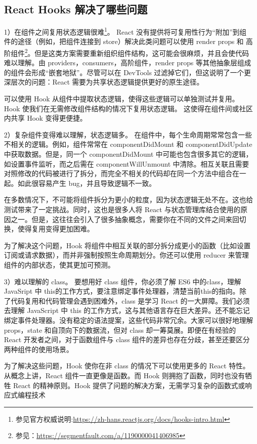\documentclass[../../../interview-questions.tex]{subfiles}
\begin{document}
\subsection{React Hooks 解决了哪些问题}

1）在组件之间复用状态逻辑很难\footnote{参见官方权威说明:\url{https://zh-hans.reactjs.org/docs/hooks-intro.html}}。
React 没有提供将可复用性行为“附加”到组件的途径（例如，把组件连接到 store）解决此类问题可以使用 render props 和 高阶组件\footnote{参见：\url{https://segmentfault.com/a/1190000041406985}}。但是这类方案需要重新组织组件结构，这可能会很麻烦，并且会使代码难以理解。由 providers，consumers，高阶组件，render props 等其他抽象层组成的组件会形成“嵌套地狱”。尽管可以在 DevTools 过滤掉它们，但这说明了一个更深层次的问题：React 需要为共享状态逻辑提供更好的原生途径。

可以使用 Hook 从组件中提取状态逻辑，使得这些逻辑可以单独测试并复用。Hook 使我们在无需修改组件结构的情况下复用状态逻辑。 这使得在组件间或社区内共享 Hook 变得更便捷。

2）复杂组件变得难以理解，状态逻辑多。
在组件中，每个生命周期常常包含一些不相关的逻辑。例如，组件常常在 componentDidMount 和 componentDidUpdate 中获取数据。但是，同一个 componentDidMount 中可能也包含很多其它的逻辑，如设置事件监听，而之后需在 componentWillUnmount 中清除。相互关联且需要对照修改的代码被进行了拆分，而完全不相关的代码却在同一个方法中组合在一起。如此很容易产生 bug，并且导致逻辑不一致。

在多数情况下，不可能将组件拆分为更小的粒度，因为状态逻辑无处不在。这也给测试带来了一定挑战。同时，这也是很多人将 React 与状态管理库结合使用的原因之一。但是，这往往会引入了很多抽象概念，需要你在不同的文件之间来回切换，使得复用变得更加困难。

为了解决这个问题，Hook 将组件中相互关联的部分拆分成更小的函数（比如设置订阅或请求数据），而并非强制按照生命周期划分。你还可以使用 reducer 来管理组件的内部状态，使其更加可预测。

3）难以理解的 class。
要想用好 class 组件，你必须了解 ES6 中的class，理解 JavaSript 中 this的工作方式，要注意绑定事件处理器，清楚当前this的指向。除了代码复用和代码管理会遇到困难外，class 是学习 React 的一大屏障。我们必须去理解 JavaScript 中 this 的工作方式，这与其他语言存在巨大差异。还不能忘记绑定事件处理器。没有稳定的语法提案，这些代码非常冗余。大家可以很好地理解 props，state 和自顶向下的数据流，但对 class 却一筹莫展。即便在有经验的 React 开发者之间，对于函数组件与 class 组件的差异也存在分歧，甚至还要区分两种组件的使用场景。

为了解决这些问题，Hook 使你在非 class 的情况下可以使用更多的 React 特性。 从概念上讲，React 组件一直更像是函数。而 Hook 则拥抱了函数，同时也没有牺牲 React 的精神原则。Hook 提供了问题的解决方案，无需学习复杂的函数式或响应式编程技术
\end{document}
